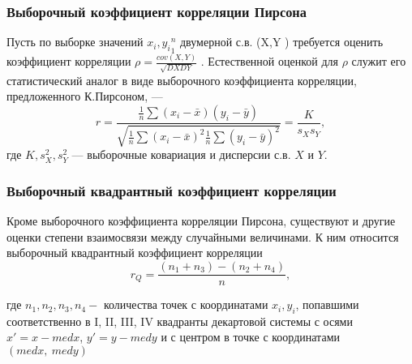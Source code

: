 \subsubsection{Выборочный коэффициент корреляции Пирсона}
\noindent Пусть по выборке значений ${x_{i},y_{i}}^{n}_{1}$ двумерной с.в. (X,Y ) требуется оценить коэффициент корреляции $\rho = \frac{cov(X,Y)}{\sqrt{DXDY}}$ . Естественной оценкой для $\rho$ служит его статистический аналог в виде выборочного коэффициента корреляции, предложенного К.Пирсоном, —
\begin{equation}
r = \frac{
	\frac{1}{n}\sum{(x_{i} - \bar{x})(y_{i}-\bar{y})}
}{
	\sqrt{\frac{1}{n}\sum{(x_{i} - \bar{x})^{2}}\frac{1}{n}\sum{(y_{i} - \bar{y})^{2}}}
}=\frac{K}{s_{X}s_{Y}},
\label{r}
\end{equation}
где $K,s^{2}_{X},s^{2}_{Y}$ — выборочные ковариация и дисперсии с.в. $X$ и $Y$.


\subsubsection{Выборочный квадрантный коэффициент корреляции}
\noindent Кроме выборочного коэффициента корреляции Пирсона, существуют и другие оценки степени взаимосвязи между случайными величинами. К ним относится выборочный квадрантный коэффициент корреляции
\begin{equation}
r_{Q} = \frac{(n_{1} + n_{3}) - (n_{2} + n_{4})}{n},
\label{rQ}
\end{equation}

\noindent где $n_1, n_2, n_3, n_4 - $ количества точек с координатами $x_i, y_i$, попавшими соответственно в I, II, III, IV квадранты декартовой системы с осями $x'=x-med x$, $y'=y-med y$ и с центром в точке с координатами $(med x,~med y)$



